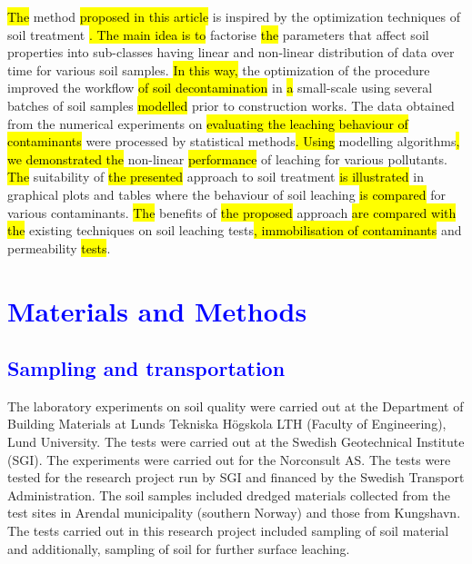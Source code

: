 \documentclass[algorithms,article,submit,pdftex,moreauthors]{Definitions/mdpi}
\begin{document}
\hl{The} method \hl{proposed in this article }is inspired by the optimization techniques of soil treatment \cite{Lindh2001,geotechnics2010005,RehmanMoghal,Yin,Kennedy}\hl{. The main idea is to }factorise \hl{the} parameters that affect soil properties into sub-classes having linear and non-linear distribution of data over time for various soil samples. \hl{In this way, }the optimization of the procedure improved the workflow \hl{of soil decontamination }in \hl{a }small-scale\hl{ }using\hl{ }several batches of soil samples \hl{modelled }prior to \hl{ }construction works. The data obtained from the numerical experiments on \hl{evaluating the leaching behaviour of contaminants} were processed by statistical methods\hl{. Using }modelling algorithms\hl{, we demonstrated the} non-linear \hl{performance} of leaching for various \hl{ }pollutants. \hl{The} suitability of \hl{the presented} approach to soil treatment \hl{is illustrated }in\hl{ }graphical plots and tables where the behaviour of soil leaching \hl{is compared }for various contaminants.\hl{ The }benefits of \hl{the proposed} approach \hl{are compared with the }existing techniques on soil leaching tests\hl{, immobilisation of contaminants} and permeability \hl{tests}.

\section{\textcolor{blue}{Materials and Methods}}

\subsection{\textcolor{blue}{Sampling and transportation}}

The laboratory experiments on soil quality were carried out at the Department of Building Materials at Lunds Tekniska Högskola LTH (Faculty of Engineering), Lund University. The tests were carried out at the Swedish Geotechnical Institute (SGI). The experiments were carried out for the Norconsult AS. The tests were tested for the research project run by SGI and financed by the Swedish Transport Administration. The soil samples included dredged materials collected from the test sites in Arendal municipality (southern Norway) and those from Kungshavn. The tests carried out in this research project included sampling of soil material and additionally, sampling of soil for further surface leaching. 
\end{document}
